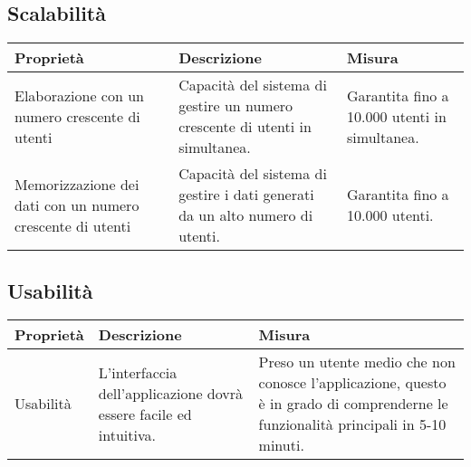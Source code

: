 \subsection{Scalabilità}
\begin{tabularx}{\textwidth}{ |X |X| X|}
    \hline
    \textbf{Proprietà} & \textbf{Descrizione} & \textbf{Misura} \\
    \hline
    Elaborazione con un numero crescente di utenti & Capacità del sistema di gestire un numero crescente di utenti in simultanea. & Garantita fino a 10.000 utenti in simultanea. \\
    \hline
    Memorizzazione dei dati con un numero crescente di utenti & Capacità del sistema di gestire i dati generati da un alto numero di utenti. & Garantita fino a 10.000 utenti. \\
    \hline
\end{tabularx}

\subsection{Usabilità}
\begin{tabularx}{\textwidth}{ |l |X| X|}
    \hline
    \textbf{Proprietà} & \textbf{Descrizione} & \textbf{Misura} \\
    \hline
    Usabilità & L’interfaccia dell’applicazione dovrà essere facile ed intuitiva. & Preso un utente medio che non conosce l’applicazione, questo è in grado di comprenderne le funzionalità principali in 5-10 minuti.\\
    \hline
\end{tabularx}


